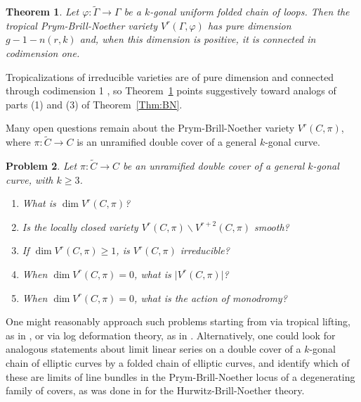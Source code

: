 \documentclass{amsart}
\newtheorem{theorem}{Theorem}[section]
\newtheorem{problem}[theorem]{Problem}
\theoremstyle{definition}
\begin{document}
\begin{theorem} \cite{CLRW20}
\label{Thm:PrymConnect}
Let $\varphi \colon \widetilde{\Gamma} \to \Gamma$ be a $k$-gonal uniform folded chain of loops.  Then the tropical Prym-Brill-Noether variety $V^r (\Gamma, \varphi)$ has pure dimension $g-1-n(r,k)$ and, when this dimension is positive, it is connected in codimension one.
\end{theorem}

\noindent Tropicalizations of irreducible varieties are of pure dimension and connected through codimension 1 \cite{CartwrightPayne12}, so Theorem~\ref{Thm:PrymConnect} points suggestively toward analogs of parts (1) and (3) of Theorem~\ref{Thm:BN}.%

Many open questions remain about the Prym-Brill-Noether variety $V^r (C,\pi)$, where $\pi \colon \widetilde{C} \to C$ is an unramified double cover of a general $k$-gonal curve.

\begin{problem}
Let $\pi \colon \widetilde{C} \to C$ be an unramified double cover of a general $k$-gonal curve, with $k \geq 3$.
\begin{enumerate}
\item  What is $\dim V^r (C,\pi)$?
\item  Is the locally closed variety $V^r (C,\pi) \smallsetminus V^{r+2} (C,\pi)$ smooth?
\item  If $\dim V^r (C,\pi) \geq 1$, is $V^r (C,\pi)$ irreducible?
\item  When $\dim V^r (C,\pi) = 0$, what is $\vert V^r (C,\pi) \vert$?
\item  When $\dim V^r (C,\pi) = 0$, what is the action of monodromy?
\end{enumerate}
\end{problem}

One might reasonably approach such problems starting from \cite{CLRW20} via tropical lifting, as in \cite{LiftingDivisors}, or via log deformation theory, as in \cite{JensenRanganathan}.  Alternatively, one could look for analogous statements about limit linear series on a double cover of a $k$-gonal chain of elliptic curves by a folded chain of elliptic curves, and identify which of these are limits of line bundles in the Prym-Brill-Noether locus of a degenerating family of covers, as was done in \cite{LLV} for the Hurwitz-Brill-Noether theory.
\end{document}
